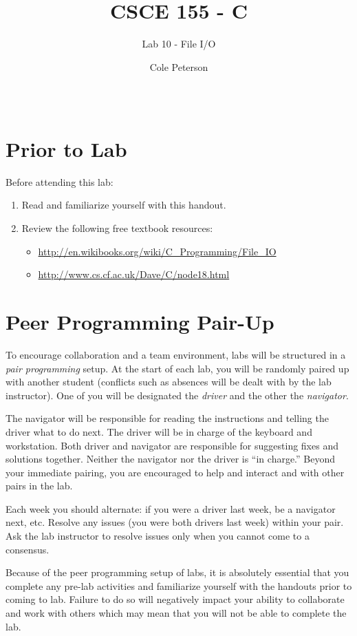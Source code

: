 \documentclass[12pt]{scrartcl}
\title{CSCE 155 - C}
\subtitle{Lab 10 - File I/O}
\author{Cole Peterson}
\date{~}
\begin{document}
\maketitle

\section*{Prior to Lab}

Before attending this lab:
\begin{enumerate}
  \item Read and familiarize yourself with this handout.
  \item Review the following free textbook resources:
	\begin{itemize}
  	  \item \url{http://en.wikibooks.org/wiki/C_Programming/File_IO}
	  \item \url{http://www.cs.cf.ac.uk/Dave/C/node18.html}
	\end{itemize}
\end{enumerate}

\section*{Peer Programming Pair-Up}

To encourage collaboration and a team environment, labs will be
structured in a \emph{pair programming} setup.  At the start of
each lab, you will be randomly paired up with another student 
(conflicts such as absences will be dealt with by the lab instructor).
One of you will be designated the \emph{driver} and the other
the \emph{navigator}.  

The navigator will be responsible for reading the instructions and
telling the driver what to do next.  The driver will be in charge of the
keyboard and workstation.  Both driver and navigator are responsible
for suggesting fixes and solutions together.  Neither the navigator
nor the driver is ``in charge.''  Beyond your immediate pairing, you
are encouraged to help and interact and with other pairs in the lab.

Each week you should alternate: if you were a driver last week, 
be a navigator next, etc.  Resolve any issues (you were both drivers
last week) within your pair.  Ask the lab instructor to resolve issues
only when you cannot come to a consensus.  

Because of the peer programming setup of labs, it is absolutely 
essential that you complete any pre-lab activities and familiarize
yourself with the handouts prior to coming to lab.  Failure to do
so will negatively impact your ability to collaborate and work with 
others which may mean that you will not be able to complete the
lab.  
\end{document}
